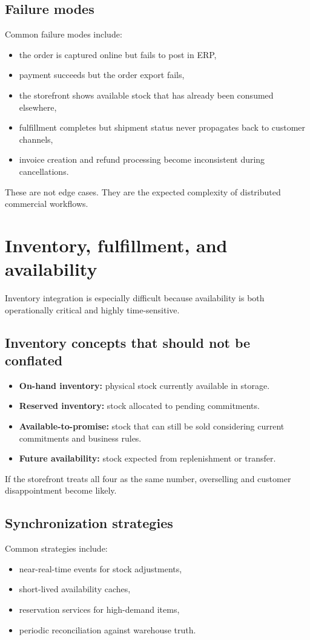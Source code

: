 \subsection{Failure modes}
Common failure modes include:
\begin{itemize}
  \item the order is captured online but fails to post in ERP,
  \item payment succeeds but the order export fails,
  \item the storefront shows available stock that has already been consumed elsewhere,
  \item fulfillment completes but shipment status never propagates back to customer channels,
  \item invoice creation and refund processing become inconsistent during cancellations.
\end{itemize}

These are not edge cases.
They are the expected complexity of distributed commercial workflows.

\section{Inventory, fulfillment, and availability}
Inventory integration is especially difficult because availability is both operationally critical and highly time-sensitive.

\subsection{Inventory concepts that should not be conflated}
\begin{itemize}
  \item \textbf{On-hand inventory:} physical stock currently available in storage.
  \item \textbf{Reserved inventory:} stock allocated to pending commitments.
  \item \textbf{Available-to-promise:} stock that can still be sold considering current commitments and business rules.
  \item \textbf{Future availability:} stock expected from replenishment or transfer.
\end{itemize}

If the storefront treats all four as the same number, overselling and customer disappointment become likely.

\subsection{Synchronization strategies}
Common strategies include:
\begin{itemize}
  \item near-real-time events for stock adjustments,
  \item short-lived availability caches,
  \item reservation services for high-demand items,
  \item periodic reconciliation against warehouse truth.
\end{itemize}

